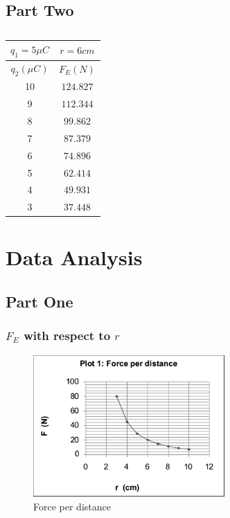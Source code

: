 \documentclass{article}
\begin{document}
\subsection{Part Two}%
\label{sub:part_two}

\begin{table}[htpb]
	\centering
	\caption{}
	\label{tab:label}
	\begin{tabular}{| c | c |}
		\hline
		$q_1 = 5 \mu C$ & $ r = 6 cm$   \\
		\hline
		$q_2 (\mu C)$ & $F_{E}(N)$\\
		\hline
		10 & $124.827$  \\
		\hline
		9 &  $112.344$ \\
		\hline
		8 &  $99.862$ \\
		\hline
		7 &  $87.379$ \\
		\hline
		6 &   $74.896$\\
		\hline
		5 &  $62.414$ \\
		\hline
		4 &   $49.931$\\
		\hline
		3 &  $37.448$ \\
		\hline
	\end{tabular}
\end{table}



\section{Data Analysis}

\subsection{Part One}%
\label{sub:part_one}


\subsubsection{$F_{E}$ with respect to $r$}%
\label{ssub:_f__e_with_respect_to_r_}

\begin{figure}[H]
	\begin{center}
		\includegraphics[width=0.65\textwidth]{plot1} %
		\caption{Force per distance}
	\end{center}
\end{figure}
\end{document}
